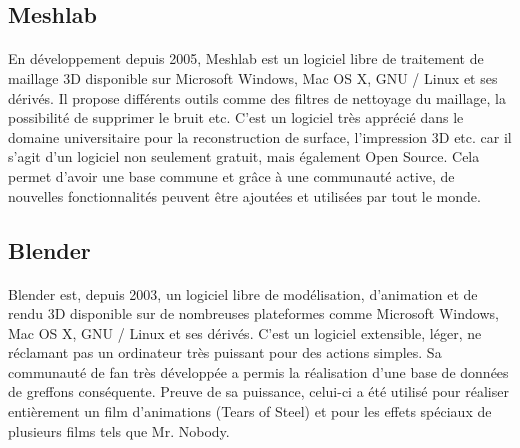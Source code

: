 \subsection{Meshlab}

\paragraph{}
	En développement depuis 2005, Meshlab est un logiciel libre de traitement de maillage 3D disponible sur Microsoft Windows, Mac OS X, GNU / Linux et ses dérivés. Il propose différents outils comme des filtres de nettoyage du maillage, la possibilité de supprimer le bruit etc. C’est un logiciel très apprécié dans le domaine universitaire pour la reconstruction de surface, l’impression 3D etc. car il s’agit d’un logiciel non seulement gratuit, mais également Open Source. Cela permet d’avoir une base commune et grâce à une communauté active, de nouvelles fonctionnalités peuvent être ajoutées et utilisées par tout le monde. 

\subsection{Blender}

\paragraph{}
	Blender est, depuis 2003, un logiciel libre de modélisation, d’animation et de rendu 3D disponible sur de nombreuses plateformes comme Microsoft Windows, Mac OS X, GNU / Linux et ses dérivés. C’est un logiciel extensible,  léger, ne réclamant pas un ordinateur très puissant pour des actions simples. Sa communauté de fan très développée a permis la réalisation d’une base de données de greffons conséquente. Preuve de sa puissance, celui-ci a été utilisé pour réaliser entièrement un film d’animations (Tears of Steel) et pour les effets spéciaux de plusieurs films tels que Mr. Nobody.
	
